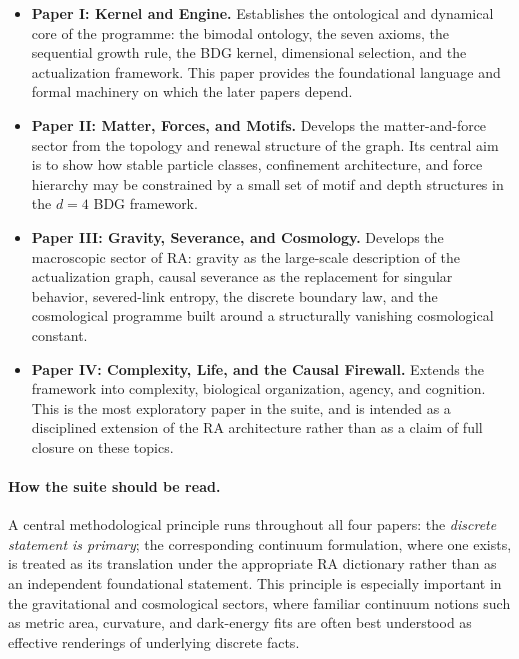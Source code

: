 \documentclass[11pt]{article}
\begin{document}
\begin{itemize}[leftmargin=1.6em,itemsep=0.6em]
    \item \textbf{Paper I: Kernel and Engine.} 
    Establishes the ontological and dynamical core of the programme: the bimodal ontology, the seven axioms, the sequential growth rule, the BDG kernel, dimensional selection, and the actualization framework. This paper provides the foundational language and formal machinery on which the later papers depend.

    \item \textbf{Paper II: Matter, Forces, and Motifs.} 
    Develops the matter-and-force sector from the topology and renewal structure of the graph. Its central aim is to show how stable particle classes, confinement architecture, and force hierarchy may be constrained by a small set of motif and depth structures in the $d=4$ BDG framework.

    \item \textbf{Paper III: Gravity, Severance, and Cosmology.} 
    Develops the macroscopic sector of RA: gravity as the large-scale description of the actualization graph, causal severance as the replacement for singular behavior, severed-link entropy, the discrete boundary law, and the cosmological programme built around a structurally vanishing cosmological constant.

    \item \textbf{Paper IV: Complexity, Life, and the Causal Firewall.} 
    Extends the framework into complexity, biological organization, agency, and cognition. This is the most exploratory paper in the suite, and is intended as a disciplined extension of the RA architecture rather than as a claim of full closure on these topics.
\end{itemize}

\paragraph{How the suite should be read.}
A central methodological principle runs throughout all four papers: the \emph{discrete statement is primary}; the corresponding continuum formulation, where one exists, is treated as its translation under the appropriate RA dictionary rather than as an independent foundational statement. This principle is especially important in the gravitational and cosmological sectors, where familiar continuum notions such as metric area, curvature, and dark-energy fits are often best understood as effective renderings of underlying discrete facts.
\end{document}
